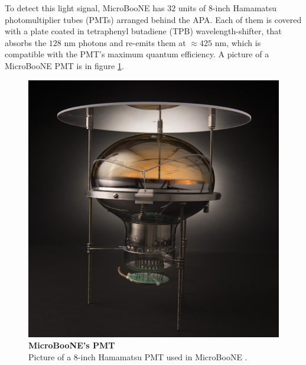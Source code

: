 %
To detect this light signal, MicroBooNE has $32$ units of 8-inch Hamamatsu photomultiplier tubes (PMTs) arranged behind the APA. Each of them is covered with a plate coated in tetraphenyl butadiene (TPB) wavelength-shifter, that absorbs the $128$ nm photons and re-emits them at $\approx425$ nm, which is compatible with the PMT's maximum quantum efficiency. A picture of a MicroBooNE PMT is in figure \ref{uboone_pmt}.
%
\begin{figure}[h!]
    \begin{center}
        \includegraphics[scale=0.2]{Figures/microboone_pmt.jpeg}
        \caption[MicroBooNE's PMT]{{\textbf{MicroBooNE's PMT}} \\Picture of a $8$-inch Hamamatsu PMT used in MicroBooNE \cite{uboone_pmt}.}
        \label{uboone_pmt} 
    \end{center}
\end{figure}
%
